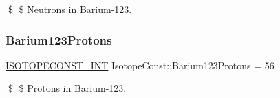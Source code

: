 \$ \$ Neutrons in Barium-\/123. \mbox{\label{group___isotope_const-_barium-_ba123_ga71c5c894797ec8bb11398a098c2d9287}} 
\subsubsection{\texorpdfstring{Barium123\+Protons}{Barium123Protons}}
{\footnotesize\ttfamily \mbox{\hyperlink{group___isotope_const-_macros_ga5f18360b3e99483a35c32d789e62621c}{I\+S\+O\+T\+O\+P\+E\+C\+O\+N\+S\+T\+\_\+\+I\+NT}} Isotope\+Const\+::\+Barium123\+Protons = 56}

\$ \$ Protons in Barium-\/123. 